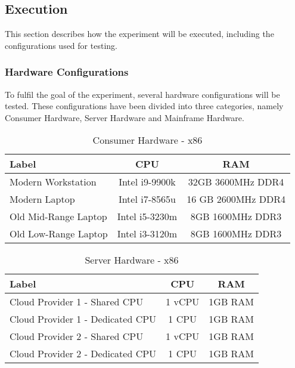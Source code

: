 \subsection{Execution}

This section describes how the experiment will be executed, including the configurations used for testing.

\subsubsection{Hardware Configurations}

To fulfil the goal of the experiment, several hardware configurations will be tested. These configurations have been divided into three categories, namely Consumer Hardware, Server Hardware and Mainframe Hardware.

\begin{table}[H]
    \centering
    \begin{tabular}{l|c|c}
        Label & CPU & RAM\\
        \hline
        Modern Workstation & Intel i9-9900k & 32GB 3600MHz DDR4\\
        Modern Laptop & Intel i7-8565u & 16 GB 2600MHz DDR4\\
        Old Mid-Range Laptop & Intel i5-3230m & 8GB 1600MHz DDR3\\
        Old Low-Range Laptop & Intel i3-3120m & 8GB 1600MHz DDR3
    \end{tabular}
    \caption{Consumer Hardware - x86}
    \label{table:method:consumer-hardware}
\end{table}

\begin{table}[H]
    \centering
    \begin{tabular}{l|c|c}
        Label & CPU & RAM\\
        \hline
        Cloud Provider 1 - Shared CPU\footnotemark & 1 vCPU & 1GB RAM \\
        Cloud Provider 1 - Dedicated CPU\footnotemark & 1 CPU & 1GB RAM \\
        Cloud Provider 2 - Shared CPU\footnotemark & 1 vCPU & 1GB RAM \\
        Cloud Provider 2 - Dedicated CPU\footnotemark & 1 CPU & 1GB RAM \\
    \end{tabular}
    \caption{Server Hardware - x86}
    \label{table:method:server-hardware}
\end{table}
\addtocounter{footnote}{-4}
\addtocounter{footnote}{1}
\addtocounter{footnote}{1}
\addtocounter{footnote}{1}
\addtocounter{footnote}{1}

